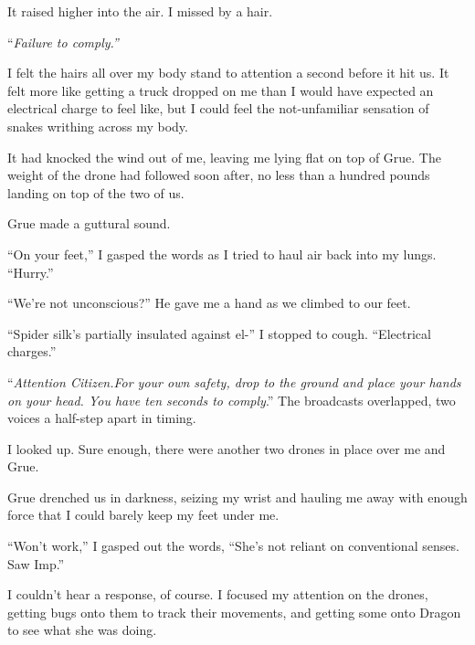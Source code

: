 It raised higher into the air.  I missed by a hair.



``\emph{Failure to comply.''}



I felt the hairs all over my body stand to attention a second before it hit us.  It felt more like getting a truck dropped on me than I would have expected an electrical charge to feel like, but I could feel the not-unfamiliar sensation of snakes writhing across my body.



It had knocked the wind out of me, leaving me lying flat on top of Grue.  The weight of the drone had followed soon after, no less than a hundred pounds landing on top of the two of us.



Grue made a guttural sound.



``On your feet,'' I gasped the words as I tried to haul air back into my lungs.  ``Hurry.''



``We're not unconscious?''  He gave me a hand as we climbed to our feet.



``Spider silk's partially insulated against el-'' I stopped to cough.  ``Electrical charges.''



``\emph{Attention Citizen.}\emph{For your own safety, drop to the ground and place your hands on your head.  You have ten seconds to comply}.''  The broadcasts overlapped, two voices a half-step apart in timing.



I looked up.  Sure enough, there were another two drones in place over me and Grue.



Grue drenched us in darkness, seizing my wrist and hauling me away with enough force that I could barely keep my feet under me.



``Won't work,'' I gasped out the words, ``She's not reliant on conventional senses.  Saw Imp.''



I couldn't hear a response, of course.  I focused my attention on the drones, getting bugs onto them to track their movements, and getting some onto Dragon to see what she was doing.




